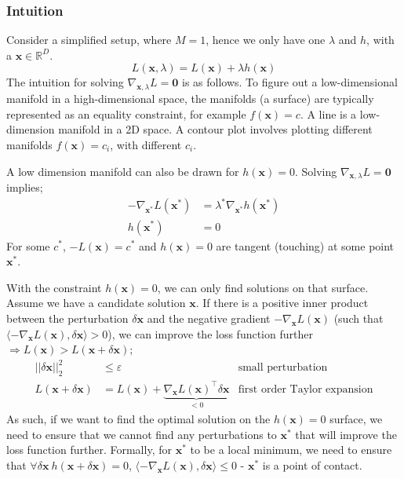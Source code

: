 \documentclass[a4paper, 12pt]{article}
\renewcommand{\vec}[1]{\boldsymbol{#1}}
\newcommand{\la}{\langle}
\newcommand{\ra}{\rangle}
\newcommand{\mbbr}[0]{\mathbb{R}}
\begin{document}
            \subsubsection*{Intuition}
                Consider a simplified setup, where $M = 1$, hence we only have one $\lambda$ and $h$, with a $\vec{x} \in \mbbr^D$.
                $$L(\vec{x}, \lambda) = L(\vec{x}) + \lambda h(\vec{x})$$
                The intuition for solving $\nabla_{\vec{x}, \lambda} L = \vec{0}$ is as follows.
                To figure out a low-dimensional manifold in a high-dimensional space, the manifolds (a surface) are typically represented as an equality constraint, for example $f(\vec{x}) = c$.
                A line is a low-dimension manifold in a 2D space.
                A contour plot involves plotting different manifolds $f(\vec{x}) = c_i$, with different $c_i$.
                \medskip

                A low dimension manifold can also be drawn for $h(\vec{x}) = 0$.
                Solving $\nabla_{\vec{x}, \lambda} L = \vec{0}$ implies;
                \begin{align*}
                    -\nabla_{\vec{x^*}}L(\vec{x^*}) & = \lambda^*\nabla_{\vec{x^*}}h(\vec{x^*}) \\
                    h(\vec{x^*}) & = 0
                \end{align*}
                For some $c^*$, $-L(\vec{x}) = c^*$ and $h(\vec{x}) = 0$ are tangent (touching) at some point $\vec{x^*}$.
                \medskip

                With the constraint $h(\vec{x}) = 0$, we can only find solutions on that surface.
                Assume we have a candidate solution $\vec{x}$.
                If there is a positive inner product between the perturbation $\delta \vec{x}$ and the negative gradient $-\nabla_{\vec{x}}L(\vec{x})$ (such that $\la -\nabla_{\vec{x}}L(\vec{x}), \delta\vec{x} \ra > 0$), we can improve the loss function further $\Rightarrow L(\vec{x}) > L(\vec{x} + \delta\vec{x})$;
                \begin{align*}
                    || \delta \vec{x} ||_2^2 & \leq \varepsilon & \text{small perturbation} \\
                    L(\vec{x} + \delta\vec{x}) & = L(\vec{x}) + \underbrace{\nabla_{\vec{x}}L(\vec{x})^\top \delta\vec{x}}_{< 0} & \text{first order Taylor expansion}
                \end{align*}
                As such, if we want to find the optimal solution on the $h(\vec{x}) = 0$ surface, we need to ensure that we cannot find any perturbations to $\vec{x^*}$ that will improve the loss function further.
                Formally, for $\vec{x^*}$ to be a local minimum, we need to ensure that $\forall \delta\vec{x}\ h(\vec{x} + \delta\vec{x}) = 0$, $\la -\nabla_{\vec{x}}L(\vec{x}), \delta\vec{x} \ra \leq 0$ - $\vec{x^*}$ is a point of contact.
                \medskip
\end{document}
